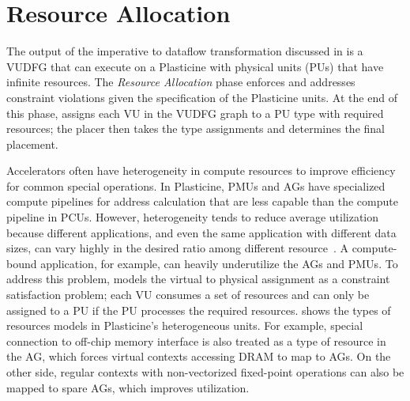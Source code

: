 \section{Resource Allocation} \label{sec:resalloc}

The output of the imperative to dataflow transformation discussed in  is a VUDFG that 
can execute on a Plasticine with physical units (PUs) that have infinite resources.
The \emph{Resource Allocation} phase enforces and addresses constraint violations given 
the specification of the Plasticine units. 
At the end of this phase, \name assigns each VU in the VUDFG graph to a PU type with required
resources; the placer then takes the type assignments and determines the final placement.

Accelerators often have heterogeneity in compute resources to improve efficiency for common
special operations.
In Plasticine, PMUs and AGs have specialized compute pipelines for address calculation that are 
less capable than the compute pipeline in PCUs.
However, heterogeneity tends to reduce average utilization because different applications, and even the same application with different data sizes, can vary highly in the desired ratio among different
resource~\cite{tz_rnn}.
A compute-bound application, for example, can heavily underutilize the AGs and PMUs.
To address this problem, \name models the virtual to physical assignment as a constraint satisfaction problem; 
each VU consumes a set of resources and can only be assigned to a PU if the PU processes the required resources. 
 shows the types of resources \name models in Plasticine's heterogeneous units.
For example, special connection to off-chip memory interface is
also treated as a type of resource in the AG, which forces virtual contexts accessing DRAM to map to AGs. 
On the other side, regular contexts with non-vectorized fixed-point operations can also be mapped to
spare AGs, which improves utilization.
